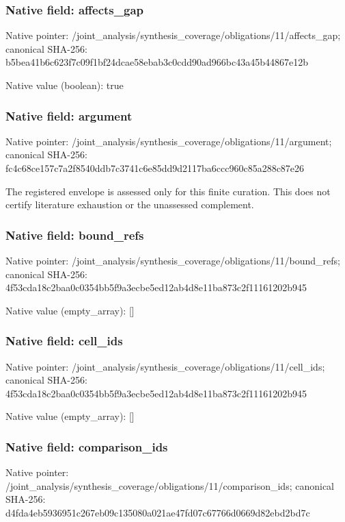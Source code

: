 \documentclass[10pt,a4paper]{article}
\begin{document}
\subsubsection{Native field: affects\_\allowbreak{}gap}
Native pointer: /joint\_\allowbreak{}analysis/synthesis\_\allowbreak{}coverage/obligations/11/affects\_\allowbreak{}gap; canonical SHA-256: b5bea41b6c623f7c09f1bf24dcae58ebab3c0cdd90ad966bc43a45b44867e12b

Native value (boolean): true

\subsubsection{Native field: argument}
Native pointer: /joint\_\allowbreak{}analysis/synthesis\_\allowbreak{}coverage/obligations/11/argument; canonical SHA-256: fc4c68ce157c7a2f8540ddb7c3741c6e85dd9d2117ba6ccc960c85a288c87e26

\begingroup\raggedright\sloppy The registered envelope is assessed only for this finite curation. This does not certify literature exhaustion or the unassessed complement.\par\endgroup

\subsubsection{Native field: bound\_\allowbreak{}refs}
Native pointer: /joint\_\allowbreak{}analysis/synthesis\_\allowbreak{}coverage/obligations/11/bound\_\allowbreak{}refs; canonical SHA-256: 4f53cda18c2baa0c0354bb5f9a3ecbe5ed12ab4d8e11ba873c2f11161202b945

Native value (empty\_\allowbreak{}array): []

\subsubsection{Native field: cell\_\allowbreak{}ids}
Native pointer: /joint\_\allowbreak{}analysis/synthesis\_\allowbreak{}coverage/obligations/11/cell\_\allowbreak{}ids; canonical SHA-256: 4f53cda18c2baa0c0354bb5f9a3ecbe5ed12ab4d8e11ba873c2f11161202b945

Native value (empty\_\allowbreak{}array): []

\subsubsection{Native field: comparison\_\allowbreak{}ids}
Native pointer: /joint\_\allowbreak{}analysis/synthesis\_\allowbreak{}coverage/obligations/11/comparison\_\allowbreak{}ids; canonical SHA-256: d4fda4eb5936951c267eb09c135080a021ae47fd07c67766d0669d82ebd2bd7c
\end{document}
